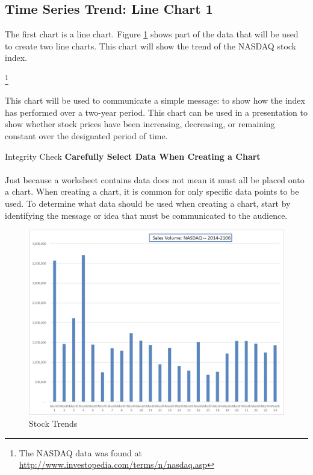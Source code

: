 \subsection{Time Series Trend: Line Chart 1}

The first chart is a line chart. Figure \ref{04:fig01} shows part of the data that will be used to create two line charts. This chart will show the trend of the NASDAQ stock index.

\footnote{The NASDAQ data was found at \url{http://www.investopedia.com/terms/n/nasdaq.asp}}

This chart will be used to communicate a simple message: to show how the index has performed over a two-year period. This chart can be used in a presentation to show whether stock prices have been increasing, decreasing, or remaining constant over the designated period of time.

\begin{center}
	\begin{infobox}{Integrity Check}
		\textbf{Carefully Select Data When Creating a Chart}
		\\
		\\
		Just because a worksheet contains data does not mean it must all be placed onto a chart. When creating a chart, it is common for only specific data points to be used. To determine what data should be used when creating a chart, start by identifying the message or idea that must be communicated to the audience.
	\end{infobox}
\end{center}

\begin{figure}[H]
	\centering
	\includegraphics[width=\maxwidth{.95\linewidth}]{gfx/ch04_fig01}
	\caption{Stock Trends}
	\label{04:fig01}
\end{figure}

